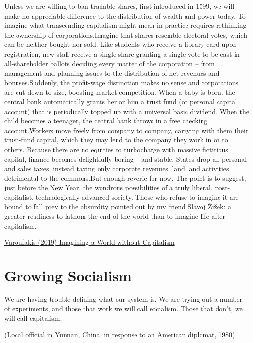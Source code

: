 \documentclass[
]{book}
\begin{document}
Unless we are willing to ban tradable shares, first introduced in 1599, we will make no appreciable difference to the distribution of wealth and power today. To imagine what transcending capitalism might mean in practice requires rethinking the ownership of corporations.Imagine that shares resemble electoral votes, which can be neither bought nor sold. Like students who receive a library card upon registration, new staff receive a single share granting a single vote to be cast in all-shareholder ballots deciding every matter of the corporation -- from management and planning issues to the distribution of net revenues and bonuses.Suddenly, the profit-wage distinction makes no sense and corporations are cut down to size, boosting market competition. When a baby is born, the central bank automatically grants her or him a trust fund (or personal capital account) that is periodically topped up with a universal basic dividend. When the child becomes a teenager, the central bank throws in a free checking account.Workers move freely from company to company, carrying with them their trust-fund capital, which they may lend to the company they work in or to others. Because there are no equities to turbocharge with massive fictitious capital, finance becomes delightfully boring -- and stable. States drop all personal and sales taxes, instead taxing only corporate revenues, land, and activities detrimental to the commons.But enough reverie for now. The point is to suggest, just before the New Year, the wondrous possibilities of a truly liberal, post-capitalist, technologically advanced society. Those who refuse to imagine it are bound to fall prey to the absurdity pointed out by my friend Slavoj Žižek: a greater readiness to fathom the end of the world than to imagine life after capitalism.

\href{https://www.project-syndicate.org/commentary/im\%20agining-a-world-without-capitalism-by-yanis-varoufakis-2019-12}{Varoufakis (2019) Imagining a World without Capitalism}

\hypertarget{growing-socialism}{%
\section{Growing Socialism}\label{growing-socialism}}

We are having trouble defining what our system is. We are trying out a number of experiments, and those that work we will call socialism. Those that don't, we will call capitalism.

(Local official in Yunnan, China, in response to an American diplomat, 1980)
\end{document}
